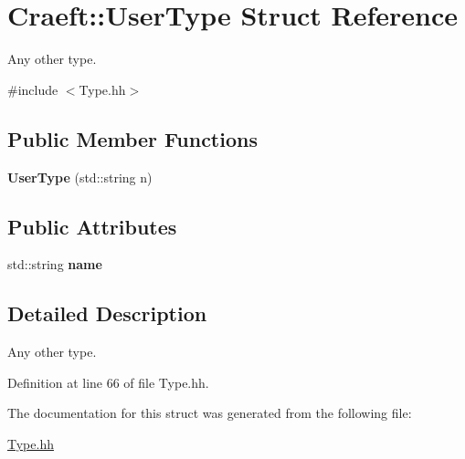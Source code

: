 \hypertarget{struct_craeft_1_1_user_type}{}\section{Craeft\+:\+:User\+Type Struct Reference}
\label{struct_craeft_1_1_user_type}


Any other type.  




{\ttfamily \#include $<$Type.\+hh$>$}

\subsection*{Public Member Functions}
\begin{DoxyCompactItemize}
\item 
\hypertarget{struct_craeft_1_1_user_type_a7f99229b15858a00c84c97239d7ee6ee}{}\label{struct_craeft_1_1_user_type_a7f99229b15858a00c84c97239d7ee6ee} 
{\bfseries User\+Type} (std\+::string n)
\end{DoxyCompactItemize}
\subsection*{Public Attributes}
\begin{DoxyCompactItemize}
\item 
\hypertarget{struct_craeft_1_1_user_type_a34c05de495b03efa16c9ce3d04121f11}{}\label{struct_craeft_1_1_user_type_a34c05de495b03efa16c9ce3d04121f11} 
std\+::string {\bfseries name}
\end{DoxyCompactItemize}


\subsection{Detailed Description}
Any other type. 

Definition at line 66 of file Type.\+hh.



The documentation for this struct was generated from the following file\+:\begin{DoxyCompactItemize}
\item 
\hyperlink{_type_8hh}{Type.\+hh}\end{DoxyCompactItemize}
